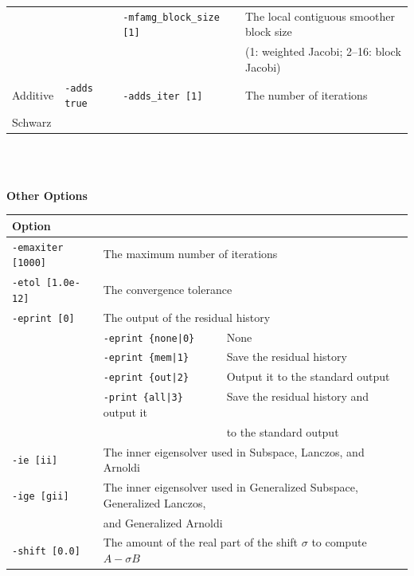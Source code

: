 \documentclass[a4paper]{article}
\begin{document}
\begin{minipage}[t]{\textwidth}
\begin{center}
\begin{tabular}{l|lll}
         &                       & \verb=-mfamg_block_size [1]= & The local contiguous smoother block size \\
         &                       &                              & (1: weighted Jacobi; 2--16: block Jacobi) \\
Additive & \verb=-adds true=     & \verb=-adds_iter [1]=       & The number of iterations   \\
Schwarz  &                       &                             &                            \\
\hline         
\end{tabular}
\end{center}
\end{minipage}
\\ \\
\begin{minipage}[t]{\textwidth}
\begin{center}
{\bf Other Options}\\
\begin{tabular}{l|ll}\hline\hline
Option &                          \\ \hline
\verb=-emaxiter [1000]= & The maximum number of iterations         \\ 
\verb=-etol [1.0e-12]=  & The convergence tolerance                \\
\verb=-eprint [0]=      & The output of the residual history                \\
                       & \verb=-eprint {none|0}     =  None \\
                       & \verb=-eprint {mem|1}      =  Save the residual history\\
                       & \verb=-eprint {out|2}      =  Output it to the standard output\\
                       & \verb=-print {all|3}       =  Save the residual history and output it \\
                       & \verb=                     =  to the standard output \\
\verb=-ie [ii]= & The inner eigensolver used in Subspace, Lanczos, and Arnoldi\\
\verb=-ige [gii]= & The inner eigensolver used in Generalized Subspace, Generalized Lanczos, \\
                       & and Generalized Arnoldi\\
\verb=-shift [0.0]= & The amount of the real part of the shift $\sigma$ to compute $A-\sigma B$ \\

\end{tabular}
\end{center}
\end{minipage}
\end{document}
